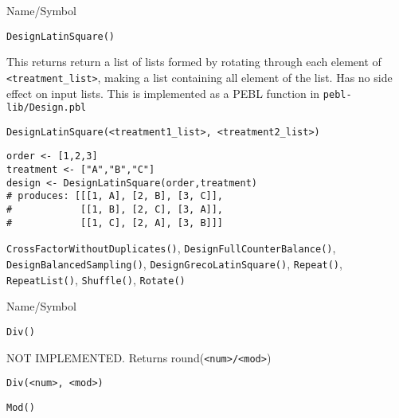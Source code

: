 \rl


\begin{desc}{Name/Symbol}
\item[Name/Symbol]	\verb+DesignLatinSquare()+

\item[Description] This returns return a list of lists formed by
  rotating through each element of \verb+<treatment_list>+, making a
  list containing all element of the list. Has no side effect on input
  lists.  This is implemented as a PEBL function in
  \texttt{pebl-lib/Design.pbl}

\item[Usage]
\begin{verbatim}
DesignLatinSquare(<treatment1_list>, <treatment2_list>)
\end{verbatim}

\item[Example]
\begin{verbatim}
order <- [1,2,3]
treatment <- ["A","B","C"]
design <- DesignLatinSquare(order,treatment)
# produces: [[[1, A], [2, B], [3, C]],
#            [[1, B], [2, C], [3, A]],
#            [[1, C], [2, A], [3, B]]]
\end{verbatim}

\item[See Also] \verb+CrossFactorWithoutDuplicates()+,
  \verb+DesignFullCounterBalance()+, \verb+DesignBalancedSampling()+,
  \verb+DesignGrecoLatinSquare()+, \verb+Repeat()+,
  \verb+RepeatList()+, \verb+Shuffle()+, \verb+Rotate()+
\end{desc}

\rl


\begin{desc}{Name/Symbol}
\item[Name/Symbol]	\verb+Div()+

\item[Description]  	NOT IMPLEMENTED.  Returns round(\verb+<num>/<mod>+)

\item[Usage]
\begin{verbatim}
Div(<num>, <mod>)
\end{verbatim}

\item[Example]	

\item[See Also]	\verb+Mod()+
\end{desc}

\rl




